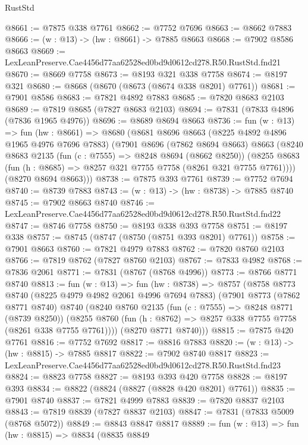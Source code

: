 \begin{lexlean}{RustStd}
\begin{coremodule}
@8661 := @7875 @338 @7761
@8662 := @7752 @7696
@8663 := @8662 @7883
@8666 := (w : @13) -> (hw : @8661) -> @7885 @8663
@8668 := @7902 @8586 @8663
@8669 := LexLeanPreserve.Cae4456d77aa62528ed0bd9d0612cd278.R50.RustStd.fnd21
@8670 := @8669 @7758
@8673 := @8193 @321 @338 @7758
@8674 := @8197 @321
@8680 := @8668 (@8670 (@8673 (@8674 @338 @8201) @7761))
@8681 := @7901 @8586
@8683 := @7821 @4892 @7883
@8685 := @7820 @8683 @2103
@8689 := @7819 @8685 (@7827 @8683 @2103)
@8694 := @7831 (@7833 @4896 (@7836 @1965 @4976))
@8696 := @8689 @8694 @8663
@8736 := fun (w : @13) =>
  fun (hw : @8661) =>
  @8680
    (@8681
      @8696
      @8663
      (@8225 @4892 @4896 @1965 @4976 @7696 @7883)
      (@7901
        @8696
        (@7862 @8694 @8663)
        @8663
        (@8240
          @8683
          @2135
          (fun (c : @7555) => @8248 @8694 (@8662 @8250))
          (@8255 @8683 (fun (h : @8685) => @8257 @321 @7755 @7758 (@8261 @321 @7755 @7761))))
        (@8270 @8694 @8663)))
@8738 := @7875 @393 @7761
@8739 := @7752 @7694
@8740 := @8739 @7883
@8743 := (w : @13) -> (hw : @8738) -> @7885 @8740
@8745 := @7902 @8663 @8740
@8746 := LexLeanPreserve.Cae4456d77aa62528ed0bd9d0612cd278.R50.RustStd.fnd22
@8747 := @8746 @7758
@8750 := @8193 @338 @393 @7758
@8751 := @8197 @338
@8757 := @8745 (@8747 (@8750 (@8751 @393 @8201) @7761))
@8758 := @7901 @8663
@8760 := @7821 @4979 @7883
@8762 := @7820 @8760 @2103
@8766 := @7819 @8762 (@7827 @8760 @2103)
@8767 := @7833 @4982
@8768 := @7836 @2061
@8771 := @7831 (@8767 (@8768 @4996))
@8773 := @8766 @8771 @8740
@8813 := fun (w : @13) =>
  fun (hw : @8738) =>
  @8757
    (@8758
      @8773
      @8740
      (@8225 @4979 @4982 @2061 @4996 @7694 @7883)
      (@7901
        @8773
        (@7862 @8771 @8740)
        @8740
        (@8240
          @8760
          @2135
          (fun (c : @7555) => @8248 @8771 (@8739 @8250))
          (@8255 @8760 (fun (h : @8762) => @8257 @338 @7755 @7758 (@8261 @338 @7755 @7761))))
        (@8270 @8771 @8740)))
@8815 := @7875 @420 @7761
@8816 := @7752 @7692
@8817 := @8816 @7883
@8820 := (w : @13) -> (hw : @8815) -> @7885 @8817
@8822 := @7902 @8740 @8817
@8823 := LexLeanPreserve.Cae4456d77aa62528ed0bd9d0612cd278.R50.RustStd.fnd23
@8824 := @8823 @7758
@8827 := @8193 @393 @420 @7758
@8828 := @8197 @393
@8834 := @8822 (@8824 (@8827 (@8828 @420 @8201) @7761))
@8835 := @7901 @8740
@8837 := @7821 @4999 @7883
@8839 := @7820 @8837 @2103
@8843 := @7819 @8839 (@7827 @8837 @2103)
@8847 := @7831 (@7833 @5009 (@8768 @5072))
@8849 := @8843 @8847 @8817
@8889 := fun (w : @13) =>
  fun (hw : @8815) =>
  @8834
    (@8835
      @8849

\end{coremodule}
\end{lexlean}
